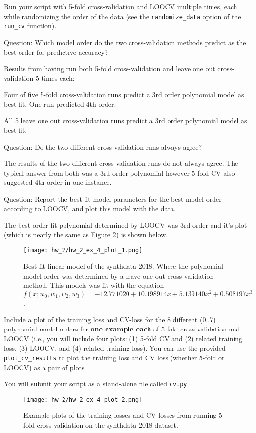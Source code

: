 \documentclass[10pt]{article}
\begin{document}
\begin{itemize}
Run your script with 5-fold cross-validation and LOOCV multiple times, each while randomizing the order of the data (see the {\tt randomize\_data} option of the {\tt run\_cv} function).


Question: Which model order do the two cross-validation methods predict as the best order for predictive accuracy?

Results from having run both 5-fold cross-validation and leave one out cross-validation 5 times each: 

Four of five 5-fold cross-validation runs predict a 3rd order polynomial model as best fit, One run predicted 4th order.  

All 5 leave one out cross-validation runs predict a 3rd order polynomial model as best fit. 

Question: Do the two different cross-validation runs always agree?

The results of the two different cross-validation runs do not always agree. The typical answer from both was a 3rd order polynomial however 5-fold CV also suggested 4th order in one instance. 

Question: Report the best-fit model parameters for the best model order according to LOOCV, and plot this model with the data.

The best order fit polynomial determined by LOOCV was 3rd order and it's plot (which is nearly the same as Figure 2) is shown below. 

\begin{figure}[H]
  \texttt{[image: hw\_2/hw\_2\_ex\_4\_plot\_1.png]}
  \caption{Best fit linear model of the synthdata 2018. Where the polynomial model order was determined by a leave one out cross validation method. This models was fit with the equation $f(x;w_0, w_1, w_2, w_3) = -12.771020 + 10.198914 x + 5.139140 x^2 + 0.508197 x^3 $.  }
\end{figure}


Include a plot of the training loss and CV-loss for the 8 different (0..7) polynomial model orders for {\bf one example each} of 5-fold cross-validation and LOOCV (i.e., you will include four plots: (1) 5-fold CV and (2) related training loss, (3) LOOCV, and (4) related training loss).  You can use the provided {\tt plot\_cv\_results} to plot the training loss and CV loss (whether 5-fold or LOOCV) as a pair of plots.

You will submit your script as a stand-alone file called {\tt cv.py}

\begin{figure}[H]
  \texttt{[image: hw\_2/hw\_2\_ex\_4\_plot\_2.png]}
  \caption{Example plots of the training losses and CV-losses from running 5-fold cross validation on the synthdata 2018 dataset.  }
\end{figure}


\end{itemize}
\end{document}
